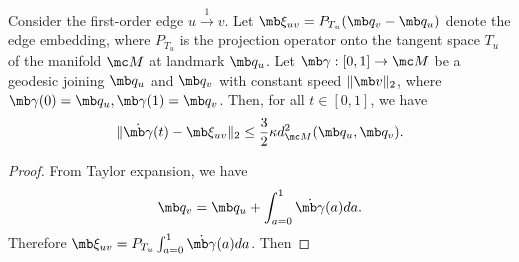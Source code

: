 {
\begin{lemma}\label{lemma:velocity-edgeembedding-comparison}
    Consider the first-order edge $u \overset{1}{\rightarrow} v$. Let $\mb\xi_{uv} = P_{T_u} (\mb q_v - \mb q_u)$ denote the edge embedding, where $P_{T_u}$ is the projection operator onto the tangent space $T_u$ of the manifold $\mc M$ at landmark $\mb q_u$. Let $\mb\gamma:[0,1] \rightarrow \mc M$ be a geodesic joining $\mb q_u$ and $\mb q_v$ with constant speed $\|\mb v\|_2$, where $\mb\gamma(0)=\mb q_u, \mb\gamma(1)=\mb q_v$. Then, for all $t\in[0,1]$, we have
    \begin{equation}
        \|\dot{\mb\gamma}(t)-\mb\xi_{uv}\|_2 \leq \frac{3}{2} \kappa d_{\mc M}^2(\mb q_u, \mb q_v).
    \end{equation}
\end{lemma}
\begin{proof}
    From Taylor expansion, we have
    \begin{equation}
        \mb q_v = \mb q_u + \int_{a=0}^1 \dot{\mb\gamma}(a) da.
    \end{equation}
Therefore $\mb \xi_{uv} = P_{T_u} \int_{a=0}^1 \dot{\mb\gamma}(a) da$. Then



\end{proof}}
